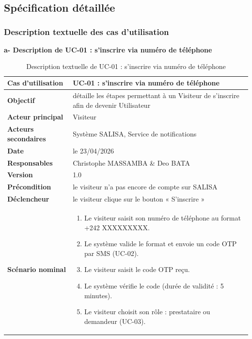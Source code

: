 \subsection{Spécification détaillée}

\subsubsection{Description textuelle des cas d'utilisation}

\noindent\textbf{\textcolor{vertCongo}{a- Description de UC-01 : s'inscrire via numéro de téléphone}}

\vspace{0.2cm}
\begin{table}[H]
	\caption{Description textuelle de UC-01 : s'inscrire via numéro de téléphone}
	\label{tab:uc01}
	\centering
	\begin{tabular}{|p{3.5cm}|p{10cm}|}
		\hline
		\rowcolor{vertClair}
		\textbf{Cas d'utilisation} & UC-01 : s'inscrire via numéro de téléphone \\
		\hline
		\textbf{Objectif} & détaille les étapes permettant à un Visiteur de s'inscrire afin de devenir Utilisateur \\
		\hline
		\textbf{Acteur principal} & Visiteur \\
		\hline
		\textbf{Acteurs secondaires} & Système SALISA, Service de notifications \\
		\hline
		\textbf{Date} & le 23/04/2026 \\
		\hline
		\textbf{Responsables} & Christophe MASSAMBA \& Deo BATA \\
		\hline
		\textbf{Version} & 1.0 \\
		\hline
		\textbf{Précondition} & le visiteur n'a pas encore de compte sur SALISA \\
		\hline
		\textbf{Déclencheur} & le visiteur clique sur le bouton « S'inscrire » \\
		\hline
		\textbf{Scénario nominal} &
		\begin{enumerate}
			\item Le visiteur saisit son numéro de téléphone au format +242 XXXXXXXXX.
			\item Le système valide le format et envoie un code OTP par SMS (UC-02).
			\item Le visiteur saisit le code OTP reçu.
			\item Le système vérifie le code (durée de validité : 5 minutes).
			\item Le visiteur choisit son rôle : prestataire ou demandeur (UC-03).

\end{enumerate}
\end{tabular}
\end{table}
